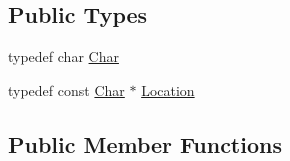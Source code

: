\subsection*{Public Types}
\begin{DoxyCompactItemize}
\item 
typedef char \hyperlink{class_json_1_1_reader_a3eec9118f3e9a672ba8348c3a79d0f45}{Char}
\item 
typedef const \hyperlink{class_json_1_1_reader_a3eec9118f3e9a672ba8348c3a79d0f45}{Char} $\ast$ \hyperlink{class_json_1_1_reader_a46795b5b272bf79a7730e406cb96375a}{Location}
\end{DoxyCompactItemize}
\subsection*{Public Member Functions}
